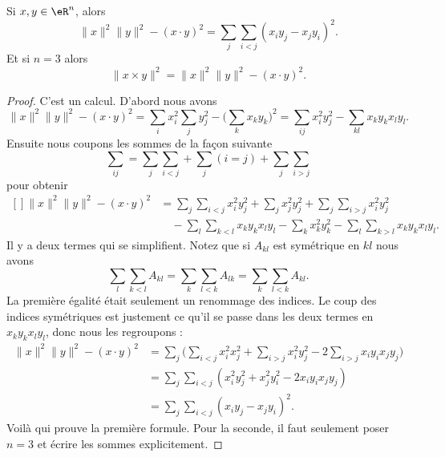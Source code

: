 \begin{proposition}     \label{PROPooMXAIooJureOD}
	Si \( x,y\in \eR^n\), alors
	\begin{equation}
		\| x \|^2\| y \|^2-(x\cdot y)^2=\sum_j\sum_{i<j}(x_iy_j-x_jy_i)^2.
	\end{equation}
	Et si \( n=3\) alors
	\begin{equation}
		\| x\times y \|^2=\| x \|^2\| y \|^2-(x\cdot y)^2.
	\end{equation}
\end{proposition}

\begin{proof}
	C'est un calcul. D'abord nous avons
	\begin{equation}
		\| x \|^2\| y \|^2-(x\cdot y)^2=\sum_ix_i^2\sum_jy_j^2-\big( \sum_k x_ky_k  \big)^2=\sum_{ij}x_i^2y_j^2-\sum_{kl}x_ky_kx_ly_l.
	\end{equation}
	Ensuite nous coupons les sommes de la façon suivante
	\begin{equation}
		\sum_{ij}=\sum_j\sum_{i<j}+\sum_j(i=j)+\sum_j\sum_{i>j}
	\end{equation}
	pour obtenir
	\begin{equation}
		\begin{aligned}[]
			\| x \|^2\| y \|^2-(x\cdot y)^2 & =\sum_j\sum_{i<j}x_i^2y_j^2+\sum_jx_j^2y_j^2+\sum_j\sum_{i>j}x_i^2y_j^2           \\
			                                & \quad-\sum_l\sum_{k<l}x_ky_kx_ly_l-\sum_kx_k^2y_k^2-\sum_l\sum_{k>l}x_ky_kx_ly_l.
		\end{aligned}
	\end{equation}
	Il y a deux termes qui se simplifient. Notez que si \( A_{kl}\) est symétrique en \( kl\) nous avons
	\begin{equation}
		\sum_l\sum_{k<l}A_{kl}=\sum_k\sum_{l<k}A_{lk}=\sum_k\sum_{l<k}A_{kl}.
	\end{equation}
	La première égalité était seulement un renommage des indices. Le coup des indices symétriques est justement ce qu'il se passe dans les deux termes en\( x_ky_kx_ly_l\), donc nous les regroupons :
	\begin{subequations}
		\begin{align}
			\| x \|^2\| y \|^2-(x\cdot y)^2 & =\sum_j\big( \sum_{i<j}x_i^2x_j^2+\sum_{i>j}x_i^2y_j^2-2\sum_{i>j}x_iy_ix_jy_j \big) \\
			                                & =\sum_j\sum_{i<j}(x_i^2y_j^2+x_j^2y_i^2-2x_iy_ix_jy_j)                               \\
			                                & =\sum_j\sum_{i<j}(x_iy_j-x_jy_i)^2.
		\end{align}
	\end{subequations}
	Voilà qui prouve la première formule. Pour la seconde, il faut seulement poser \( n=3\) et écrire les sommes explicitement.


\end{proof}
